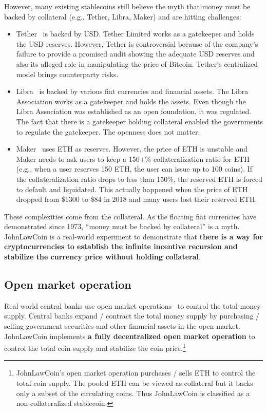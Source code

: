 \documentclass[dvipdfmx,a4paper]{article}
\begin{document}
However, many existing stablecoins still believe the myth that money must be backed by collateral (e.g., Tether, Libra, Maker) and are hitting challenges:

\begin{itemize}
\item Tether~\cite{tether} is backed by USD. Tether Limited works as a gatekeeper and holds the USD reserves. However, Tether is controversial because of the company's failure to provide a promised audit showing the adequate USD reserves and also its alleged role in manipulating the price of Bitcoin. Tether's centralized model brings counterparty risks.
\item Libra~\cite{libra} is backed by various fiat currencies and financial assets. The Libra Association works as a gatekeeper and holds the assets. Even though the Libra Association was established as an open foundation, it was regulated. The fact that there is a gatekeeper holding collateral enabled the governments to regulate the gatekeeper. The openness does not matter.
\item Maker~\cite{makerdao} uses ETH as reserves. However, the price of ETH is unstable and Maker needs to ask users to keep a 150+\% collateralization ratio for ETH (e.g., when a user reserves 150 ETH, the user can issue up to 100 coins). If the collateralization ratio drops to less than 150\%, the reserved ETH is forced to default and liquidated. This actually happened when the price of ETH dropped from \$1300 to \$84 in 2018 and many users lost their reserved ETH.
\end{itemize}

These complexities come from the collateral. As the floating fiat currencies have demonstrated since 1973, ``money must be backed by collateral'' is a myth. JohnLawCoin is a real-world experiment to demonstrate that \textbf{there is a way for cryptocurrencies to establish the infinite incentive recursion and stabilize the currency price without holding collateral}.

\subsection{Open market operation}

Real-world central banks use open market operations~\cite{ayuso2003model} to control the total money supply. Central banks expand / contract the total money supply by purchasing / selling government securities and other financial assets in the open market. JohnLawCoin implements \textbf{a fully decentralized open market operation} to control the total coin supply and stabilize the coin price.\footnote{JohnLawCoin's open market operation purchases / sells ETH to control the total coin supply. The pooled ETH can be viewed as collateral but it backs only a subset of the circulating coins. Thus JohnLawCoin is classified as a non-collateralized stablecoin.}
\end{document}
